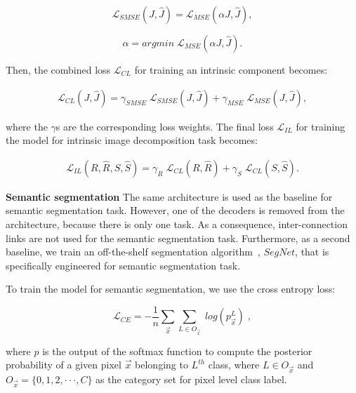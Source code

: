 \documentclass[runningheads]{llncs}
\begin{document}
\begin{equation} \label{eq:SMSE}
\mathcal{L}_{SMSE}(J, \hat{J}) = \mathcal{L}_{MSE}(\alpha J, \hat{J}),
\end{equation}

\begin{equation} \label{eq:alpha}
\alpha =  argmin \; \mathcal{L}_{MSE}(\alpha J, \hat{J}).
\end{equation}

\noindent Then, the combined loss $\mathcal{L}_{CL}$ for training an intrinsic component becomes:

\begin{equation} \label{eq:CL}
\begin{aligned}
\mathcal{L}_{CL}(J, \hat{J}) = \gamma_{SMSE} \; \mathcal{L}_{SMSE}(J, \hat{J}) + \gamma_{MSE} \; \mathcal{L}_{MSE}(J, \hat{J}),
\end{aligned}
\end{equation}

\noindent where the $\gamma$s are the corresponding loss weights. The final loss $\mathcal{L}_{IL}$ for training the model for intrinsic image decomposition task becomes:

\begin{equation} \label{eq:CL2}
\begin{aligned}
\mathcal{L}_{IL}(R, \hat{R}, S, \hat{S}) = \gamma_{R} \; \mathcal{L}_{CL}(R, \hat{R}) + \gamma_{S} \; \mathcal{L}_{CL}(S, \hat{S}).
\end{aligned}
\end{equation}

\noindent \textbf{Semantic segmentation} The same architecture is used as the baseline for semantic segmentation task. However, one of the decoders is removed from the architecture, because there is only one task. As a consequence, inter-connection links are not used for the semantic segmentation task. Furthermore, as a second baseline, we train an off-the-shelf segmentation algorithm~\cite{segnet}, $SegNet$, that is specifically engineered for semantic segmentation task.  

To train the model for semantic segmentation, we use the cross entropy loss:

\begin{equation} \label{eq:ce}
\mathcal{L}_{CE} = - \frac{1}{n} \sum_{\vec{x}}^{} \sum_{L \in O_{\vec{x}}}^{} \;log(p_{\vec{x}}^{L}) \; ,
\end{equation}

\noindent where $p$ is the output of the softmax function to compute the posterior probability of a given pixel $\vec{x}$ belonging to $L^{th}$ class, where $L \in O_{\vec{x}}$ and $O_{\vec{x}} = \{0, 1, 2, \cdot \cdot \cdot , C\}$ as the category set for pixel level class label.
\end{document}
